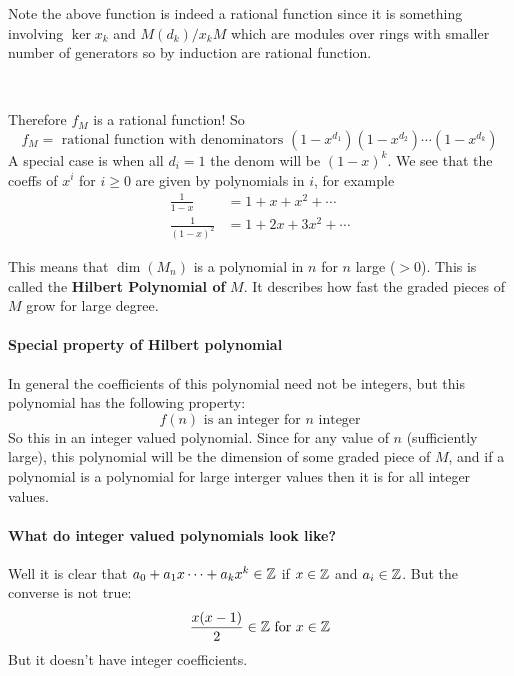 Note the above function is indeed a rational function since it is something involving $\ker x_k$ and $M(d_k)/x_k M$ which are modules over rings with smaller number of generators so by induction are rational function.

\

Therefore $f_M$ is a rational function! So \[f_M = \text{ rational function with denominators }(1-x^{d_1})(1-x^{d_2})\cdots (1-x^{d_k})\]
A special case is when all $d_i = 1$ the denom will be ${(1-x)}^k$. We see that the coeffs of $x^i$ for $i\geq 0$ are given by polynomials in $i$, for example\begin{align*}
    \frac{1}{1-x} &= 1+x+x^2+\cdots\\
    \frac{1}{{(1-x)}^2} &= 1+2x+3x^2+\cdots
\end{align*}
\begin{definition}
    This means that $\dim(M_n)$ is a polynomial in $n$ for $n$ large ($>0$). This is called the \textbf{Hilbert Polynomial of }$M$. It describes how fast the graded pieces of $M$ grow for large degree. 
\end{definition}
\paragraph*{Special property of Hilbert polynomial}
In general the coefficients of this polynomial need not be integers, but this polynomial has the following property:\[f(n) \text{ is an integer for }n\text{ integer}\]
So this in an integer valued polynomial. Since for any value of $n$ (sufficiently large), this polynomial will be the dimension of some graded piece of $M$, and if a polynomial is a polynomial for large interger values then it is for all integer values. 


\paragraph*{What do integer valued polynomials look like?}

Well it is clear that $a_0+a_1x\cdots+a_k x^k\in \mathbb{Z}$ if $x\in \mathbb{Z}$ and $a_i\in \mathbb{Z}$. But the converse is not true:\[\frac{x(x-1)}{2}\in \mathbb{Z} \text{ for }x\in \mathbb{Z}\]
But it doesn't have integer coefficients.

\

